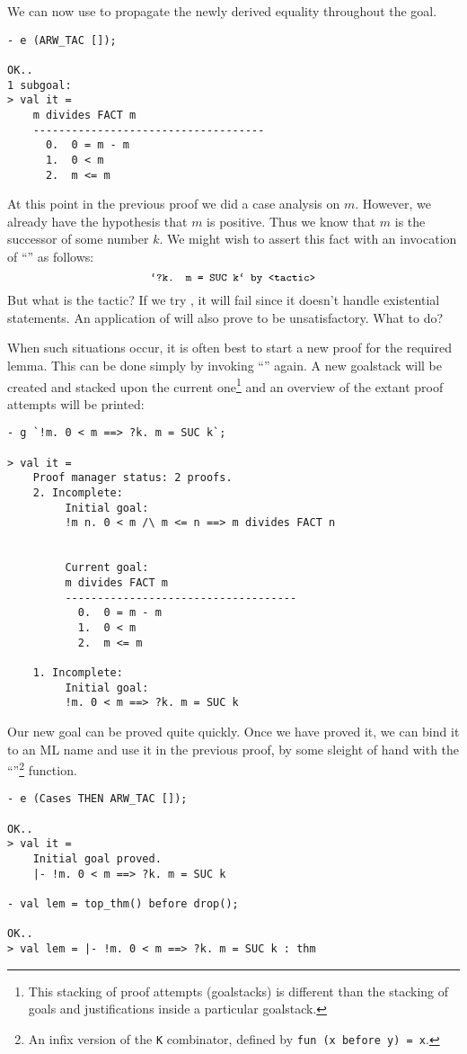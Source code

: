 We can now use  to propagate the newly derived equality
throughout the goal.
\begin{session}\begin{verbatim}
- e (ARW_TAC []);

OK..
1 subgoal:
> val it =
    m divides FACT m
    ------------------------------------
      0.  0 = m - m
      1.  0 < m
      2.  m <= m
\end{verbatim}\end{session}
    At this point in the previous proof we did a case analysis on $m$.
    However, we already have the hypothesis that $m$ is positive. Thus
    we know that $m$ is the successor of some number $k$. We might
    wish to assert this fact with an invocation of ``'' as
    follows:
\[
    \mbox{\ml{`?k. m = SUC k` by <tactic>}}
\]
But what is the tactic? If we try , it will fail since
it doesn't handle existential statements. An application of
 will also prove to be unsatisfactory. What to do?

When such situations occur, it is often best to start a new proof for
the required lemma. This can be done simply by invoking ``''
again. A new goalstack will be created and stacked upon the current
one\footnote{This stacking of proof attempts (goalstacks) is different
  than the stacking of goals and justifications inside a particular
  goalstack.}  and an overview of the extant proof attempts will be
printed:
\begin{session}\begin{verbatim}
- g `!m. 0 < m ==> ?k. m = SUC k`;

> val it =
    Proof manager status: 2 proofs.
    2. Incomplete:
         Initial goal:
         !m n. 0 < m /\ m <= n ==> m divides FACT n


         Current goal:
         m divides FACT m
         ------------------------------------
           0.  0 = m - m
           1.  0 < m
           2.  m <= m

    1. Incomplete:
         Initial goal:
         !m. 0 < m ==> ?k. m = SUC k
\end{verbatim}\end{session}
    Our new goal can be proved quite quickly. Once we have proved it,
    we can bind it to an ML name and use it in the previous proof, by
    some sleight of hand with the ``''\footnote{An infix
      version of the {\tt K} combinator, defined by {\tt fun (x before
        y) = x}.} function.
\begin{session}\begin{verbatim}
- e (Cases THEN ARW_TAC []);

OK..
> val it =
    Initial goal proved.
    |- !m. 0 < m ==> ?k. m = SUC k

- val lem = top_thm() before drop();

OK..
> val lem = |- !m. 0 < m ==> ?k. m = SUC k : thm
\end{verbatim}\end{session}

